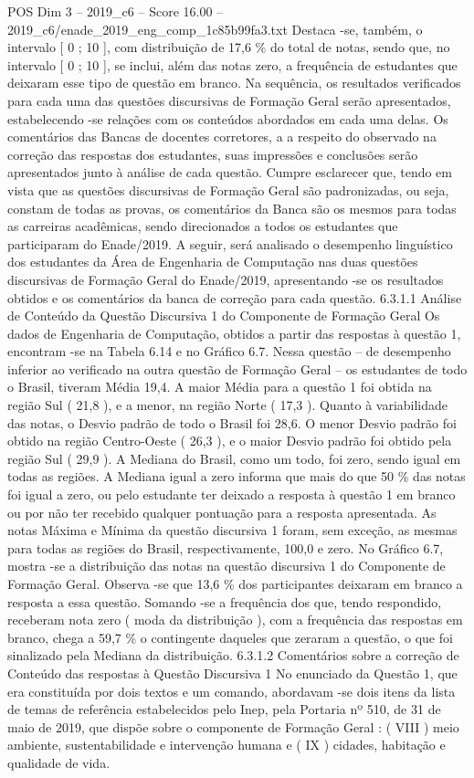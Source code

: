 \begin{textsample}{POS Dim 3 – 2019\_c6 – Score 16.00 – 2019\_c6/enade\_2019\_eng\_comp\_1c85b99fa3.txt}
Destaca -se, também, o intervalo [ 0 ; 10 ], com distribuição de 17,6 \% do total de notas, sendo que, no intervalo [ 0 ; 10 ], se inclui, além das notas zero, a frequência de estudantes que deixaram esse tipo de questão em branco.
Na sequência, os resultados verificados para cada uma das questões discursivas de Formação Geral serão apresentados, estabelecendo -se relações com os conteúdos abordados em cada uma delas.
Os comentários das Bancas de docentes corretores, a a respeito do observado na correção das respostas dos estudantes, suas impressões e conclusões serão apresentados junto à análise de cada questão.
Cumpre esclarecer que, tendo em vista que as questões discursivas de Formação Geral são padronizadas, ou seja, constam de todas as provas, os comentários da Banca são os mesmos para todas as carreiras acadêmicas, sendo direcionados a todos os estudantes que participaram do Enade/2019.
A seguir, será analisado o desempenho linguístico dos estudantes da Área de Engenharia de Computação nas duas questões discursivas de Formação Geral do Enade/2019, apresentando -se os resultados obtidos e os comentários da banca de correção para cada questão. 6.3.1.1 Análise de Conteúdo da Questão Discursiva 1 do Componente de Formação Geral Os dados de Engenharia de Computação, obtidos a partir das respostas à questão 1, encontram -se na Tabela 6.14 e no Gráfico 6.7.
Nessa questão – de desempenho inferior ao verificado na outra questão de Formação Geral – os estudantes de todo o Brasil, tiveram Média 19,4.
A maior Média para a questão 1 foi obtida na região Sul ( 21,8 ), e a menor, na região Norte ( 17,3 ).
Quanto à variabilidade das notas, o Desvio padrão de todo o Brasil foi 28,6.
O menor Desvio padrão foi obtido na região Centro-Oeste ( 26,3 ), e o maior Desvio padrão foi obtido pela região Sul ( 29,9 ).
A Mediana do Brasil, como um todo, foi zero, sendo igual em todas as regiões.
A Mediana igual a zero informa que mais do que 50 \% das notas foi igual a zero, ou pelo estudante ter deixado a resposta à questão 1 em branco ou por não ter recebido qualquer pontuação para a resposta apresentada.
As notas Máxima e Mínima da questão discursiva 1 foram, sem exceção, as mesmas para todas as regiões do Brasil, respectivamente, 100,0 e zero.
No Gráfico 6.7, mostra -se a distribuição das notas na questão discursiva 1 do Componente de Formação Geral.
Observa -se que 13,6 \% dos participantes deixaram em branco a resposta a essa questão.
Somando -se a frequência dos que, tendo respondido, receberam nota zero ( moda da distribuição ), com a frequência das respostas em branco, chega a 59,7 \% o contingente daqueles que zeraram a questão, o que foi sinalizado pela Mediana da distribuição. 6.3.1.2 Comentários sobre a correção de Conteúdo das respostas à Questão Discursiva 1 No enunciado da Questão 1, que era constituída por dois textos e um comando, abordavam -se dois itens da lista de temas de referência estabelecidos pelo Inep, pela Portaria nº 510, de 31 de maio de 2019, que dispõe sobre o componente de Formação Geral : ( VIII ) meio ambiente, sustentabilidade e intervenção humana e ( IX ) cidades, habitação e qualidade de vida.

\end{textsample}
